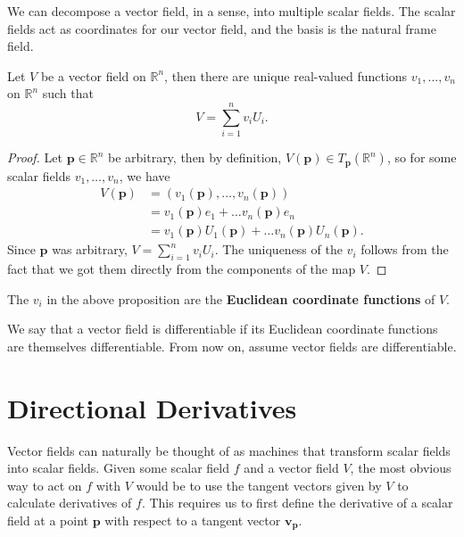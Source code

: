 \documentclass[10pt]{report}
\begin{document}
We can decompose a vector field, in a sense, into multiple scalar fields. The scalar fields act as coordinates for our vector field, and the basis is the natural frame field.

\begin{prop}
	Let $V$ be a vector field on $\mathbb{R}^n$, then there are unique real-valued functions $v_1, \dots, v_n$ on $\mathbb{R}^n$ such that
	\[
	V = \sum_{i=1}^{n} v_i U_i.
	\] 
\end{prop}
\begin{proof}
	Let $\mathbf{p} \in \mathbb{R}^n$ be arbitrary, then by definition, $V(\mathbf{p}) \in T_\mathbf{p}(\mathbb{R}^n)$, so for some scalar fields $v_1, \dots, v_n$, we have
	\begin{align*}
		V(\mathbf{p}) &= (v_1(\mathbf{p}), \dots, v_n(\mathbf{p})) \\
		     &= v_1(\mathbf{p})e_1 + \dots v_n(\mathbf{p})e_n \\
		     &= v_1(\mathbf{p}) U_1(\mathbf{p}) + \dots v_n(\mathbf{p}) U_n(\mathbf{p}).
	\end{align*}
	Since $\mathbf{p}$ was arbitrary, $V = \sum_{i=1}^{n} v_i U_i$. The uniqueness of the $v_i$ follows from the fact that we got them directly from the components of the map $V$.
\end{proof}

\begin{defn}
	The $v_i$ in the above proposition are the \textbf{Euclidean coordinate functions} of $V$.
\end{defn}

\begin{note}
	We say that a vector field is differentiable if its Euclidean coordinate functions are themselves differentiable. From now on, assume vector fields are differentiable.
\end{note}



\section{Directional Derivatives}

Vector fields can naturally be thought of as machines that transform scalar fields into scalar fields. Given some scalar field $f$ and a vector field $V$, the most obvious way to act on $f$ with $V$ would be to use the tangent vectors given by $V$ to calculate derivatives of $f$. This requires us to first define the derivative of a scalar field at a point $\mathbf{p}$ with respect to a tangent vector $\mathbf{v}_\mathbf{p}$.
\end{document}
